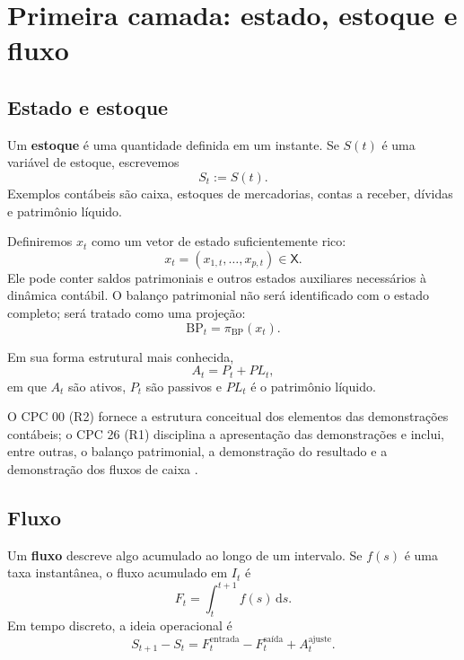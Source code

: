 \documentclass[11pt,a4paper]{article}
\newcommand{\BP}{\mathrm{BP}}
\newcommand{\dd}{\,\mathrm{d}}
\begin{document}
\section{Primeira camada: estado, estoque e fluxo}

\subsection{Estado e estoque}

Um \textbf{estoque} é uma quantidade definida em um instante. Se $S(t)$ é uma variável de estoque, escrevemos
\[
S_t:=S(t).
\]
Exemplos contábeis são caixa, estoques de mercadorias, contas a receber, dívidas e patrimônio líquido.

Definiremos $x_t$ como um vetor de estado suficientemente rico:
\begin{equation}
\boxed{x_t=(x_{1,t},\ldots,x_{p,t})\in\mathsf X.}
\end{equation}
Ele pode conter saldos patrimoniais e outros estados auxiliares necessários à dinâmica contábil. O balanço patrimonial não será identificado com o estado completo; será tratado como uma projeção:
\begin{equation}
\boxed{\BP_t=\pi_{\BP}(x_t).}
\label{eq:bp-projecao}
\end{equation}

Em sua forma estrutural mais conhecida,
\begin{equation}
\boxed{A_t=P_t+PL_t,}
\label{eq:equacao-patrimonial}
\end{equation}
em que $A_t$ são ativos, $P_t$ são passivos e $PL_t$ é o patrimônio líquido.

\begin{fonte}
O CPC 00 (R2) fornece a estrutura conceitual dos elementos das demonstrações contábeis; o CPC 26 (R1) disciplina a apresentação das demonstrações e inclui, entre outras, o balanço patrimonial, a demonstração do resultado e a demonstração dos fluxos de caixa \cite{CPC00,CPC26}.
\end{fonte}

\subsection{Fluxo}

Um \textbf{fluxo} descreve algo acumulado ao longo de um intervalo. Se $f(s)$ é uma taxa instantânea, o fluxo acumulado em $I_t$ é
\[
F_t=\int_t^{t+1} f(s)\dd s.
\]
Em tempo discreto, a ideia operacional é
\begin{equation}
\boxed{S_{t+1}-S_t=F_t^{\text{entrada}}-F_t^{\text{saída}}+A_t^{\text{ajuste}}.}
\label{eq:estoque-fluxo}
\end{equation}
\end{document}
